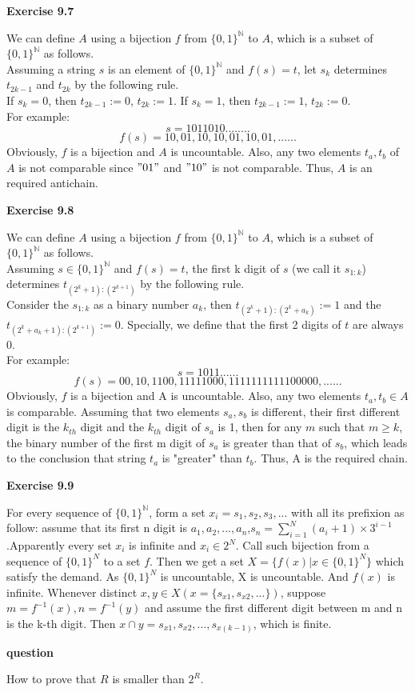 \documentclass{article} %
\begin{document}
	\textbf{Exercise 9.7}\par
    	We can define $A$ using a bijection $f$ from ${\{0,1\}}^{\mathbb{N}}$ to $A$, which is a subset of ${\{0,1\}}^{\mathbb{N}}$ as follows.\\
	Assuming a string $s$ is an element of ${\{0,1\}}^{\mathbb{N}}$ and $f(s)=t$, let $s_k$ determines $t_{2k-1}$ and $t_{2k}$ by the following rule.\\
	If $s_k=0$, then $t_{2k-1}:=0$, $t_{2k}:=1$. If $s_k=1$, then $t_{2k-1}:=1$, $t_{2k}:=0$.\\
	For example:\\
	$$
	s=1011010........
	$$
	$$
	f(s)=10,01,10,10,01,10,01,......
	$$
	Obviously, $f$ is a bijection and $A$ is uncountable. Also, any two elements $t_{a},t_{b}$ of $A$ is not comparable since $"01"$ and $"10"$ is not comparable.
	Thus, $A$ is an required antichain.\par
	\textbf{Exercise 9.8}\par
	 We can define $A$ using a bijection $f$ from $\{0,1\}^{\mathbb{N}}$ to $A$, which is a subset of $\{0,1\}^{\mathbb{N}}$ as follows.\\
 Assuming $s\in \{0,1\}^{\mathbb{N}}$ and $f(s)=t$, the first k digit of $s$ (we call it $s_{1:k}$) determines $t_{(2^{k}+1):(2^{k+1})}$ by the following rule.\\
	 
	 	 Consider the $s_{1:k}$ as a binary number $a_k$, then $t_{(2^{k}+1):(2^{k}+a_k)}:=1$ and the $t_{(2^{k}+a_k+1):(2^{k+1})}:=0$. Specially, we define that the first 2 digits of $t$ are always $0$.\\  
	 
	 For example:\\
	 $$
	 s=1011......
	 $$
	 $$
	 f(s)=00,10,1100,11111000,1111111111100000,......
	 $$
	 Obviously, $f$ is a bijection and A is uncountable. Also, any two elements $t_a,t_b\in A$ is comparable. Assuming that two elements $s_a,s_b$ is different, their first different digit is the $k_{th}$ digit and the $k_{th}$ digit of $s_a$ is 1, then for any $m$ such that $m \ge k$, the binary number of the first m digit of $s_a$ is greater than that of $s_b$, which leads to the conclusion that string $t_a$ is "greater" than $t_b$. Thus, A is the required chain. \par

	
  \textbf{Exercise 9.9}\par
	  For every sequence of $\{0,1\} ^\mathbb{N}$, form a set $x_i={s_1,s_2,s_3,...}$ with all its prefixion as follow: assume that its first n digit is $a_1,a_2,...,a_n$,$s_n=\sum_{i=1}^N(a_i+1)\times 3^{i-1}$.Apparently every set $x_i$ is infinite and $x_i\in 2^N$. Call such bijection from a sequence of $\{0,1\}^N$ to a set $f$. Then we get a set $X=\{f(x)|x\in \{0,1\}^N\}$ which satisfy the demand. As $\{0,1\} ^N$ is uncountable, X is uncountable. And $f(x)$ is infinite. Whenever distinct $x,y \in X(x=\{s_{x1},s_{x2},...\})$, suppose $m=f^{-1}(x),n=f^{-1}(y)$ and assume the first different digit between m and n is the k-th digit. Then $x\cap y={s_{x1},s_{x2},...,s_{x(k-1)}}$, which is finite.
	 
		\textbf{question}\par
	 How to prove that $R$ is smaller than $2^R$.
	
\end{document}
